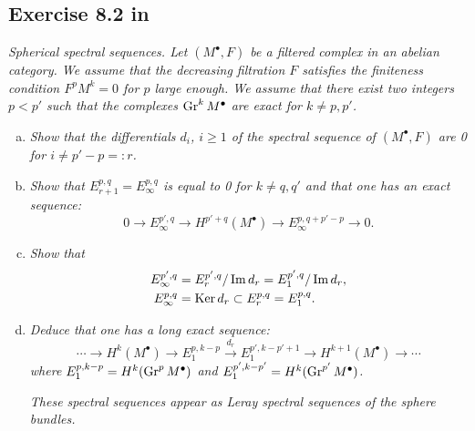 \documentclass{article}
\begin{document}
\subsection*{Exercise 8.2 in \cite{Voi1}}
\emph{Spherical spectral sequences. Let $(M^{\bullet},F)$ be a filtered complex in an abelian category. We assume
that the decreasing filtration $F$ satisfies the finiteness condition $F^pM^k = 0$ for $p$ large enough. We
assume that there exist two integers $p<p'$ such that the complexes $\operatorname{Gr}^k M^{\bullet}$ are exact for $k\neq p,p'$.}
\begin{enumerate}[(a)]
\item \emph{Show that the differentials $d_i$, $i\geq 1$ of the spectral sequence of $(M^{\bullet},F)$ are 0
for $i\neq p'-p =:r$.}

\item \emph{Show that $E_{r+1}^{p,q} = E_{\infty}^{p,q}$ is equal to 0 for $k\neq q,q'$ and that one has an
exact sequence:}
\[	0 \to E^{p',q}_{\infty} \to H^{p'+q}(M^{\bullet}) \to E^{p,q+p'-p}_{\infty} \to 0.	\]

\item \emph{Show that}
\begin{align*}
E_{\infty}^{p',q} &= E_r^{p',q}/\operatorname{Im} d_r = E_1^{p',q}/\operatorname{Im} d_r, \\
E_{\infty}^{p,q} &= \operatorname{Ker} d_r \subset E_r^{p,q} = E_1^{p,q}.
\end{align*}

\item \emph{Deduce that one has a long exact sequence:}
\[	\cdots \to H^k(M^{\bullet}) \to E_1^{p,k-p} \overset{d_r}{\to} E_1^{p',k-p'+1} \to 
H^{k+1}(M^{\bullet}) \to \cdots	\]
\emph{where $E_1^{p,k-p} = H^k(\operatorname{Gr}^p M^{\bullet})$ and $E_1^{p',k-p'} = H^k(\operatorname{Gr}^{p'} M^{\bullet})$.}

\emph{These spectral sequences appear as Leray spectral sequences of the sphere bundles.}
\end{enumerate}
\end{document}
